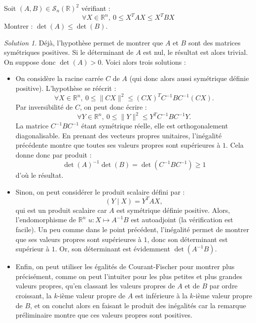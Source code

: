 \documentclass[french]{book}
\newcommand{\R}{\mathbb{R}}
\newcommand{\inv}{^{-1}}
\theoremstyle{definition}
\theoremstyle{remark}
\newtheorem*{sol}{Solution}
\begin{document}
\begin{exo}[2]{}
	Soit $(A,B)\in\mathcal{S}_n(\R)^2$ vérifiant : $$\forall X\in\R^n,\ 0\leqslant X^TAX\leqslant X^TBX$$ Montrer : $\det(A)\leqslant\det(B)$.
\end{exo}
\begin{sol}
	Déjà, l'hypothèse permet de montrer que $A$ et $B$ sont des matrices symétriques positives. Si le déterminant de $A$ est nul, le résultat est alors trivial. On suppose donc $\det(A)>0$. Voici alors trois solutions :
	\begin{itemize}
		\item On considère la racine carrée $C$ de $A$ (qui donc alors aussi symétrique définie positive). L'hypothèse se réécrit :
		$$\forall X\in\R^n,\ 0\leqslant\lVert CX\rVert^2\leqslant (CX)^TC\inv BC\inv (CX).$$
		Par inversibilité de $C$, on peut donc écrire :
		$$\forall Y\in\R^n,\ 0\leqslant \lVert Y\rVert^2\leqslant Y^T C\inv BC\inv Y.$$
		La matrice $C\inv BC\inv$ étant symétrique réelle, elle est orthogonalement diagonalisable. En prenant des vecteurs propres unitaires, l'inégalité précédente montre que toutes ses valeurs propres sont supérieures à $1$. Cela donne donc par produit :
		$$\det(A)\inv\det(B)=\det(C\inv BC\inv)\geqslant1$$ d'où le résultat.
		\item Sinon, on peut considérer le produit scalaire défini par :
		$$(Y\mid X)=Y^TAX,$$ qui est un produit scalaire car $A$ est symétrique définie positive. Alors, l'endomorphisme de $\R^n$ $u:X\mapsto A\inv B$ est autoadjoint (la vérification est facile). Un peu comme dans le point précédent, l'inégalité permet de montrer que ses valeurs propres sont supérieures à $1$, donc son déterminant est supérieur à $1$. Or, son déterminant est évidemment $\det(A\inv B)$.
		\item Enfin, on peut utiliser les égalités de Courant-Fischer pour montrer plus précisément, comme on peut l'intuiter pour les plus petites et plus grandes valeurs propres, qu'en classant les valeurs propres de $A$ et de $B$ par ordre croissant, la $k$-ième valeur propre de $A$ est inférieure à la $k$-ième valeur propre de $B$, et on conclut alors en faisant le produit des inégalités car la remarque préliminaire montre que ces valeurs propres sont positives.
	\end{itemize}
\end{sol}
\end{document}
